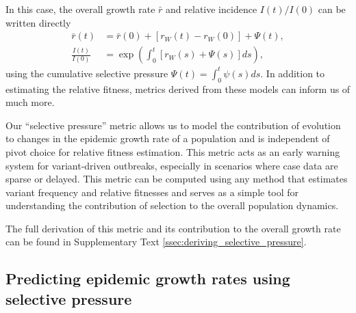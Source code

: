 \documentclass[11pt,oneside,letterpaper]{article}
\newcommand{\wt}{W}
\begin{document}
In this case, the overall growth rate $\bar{r}$ and relative incidence $I(t) / I(0)$ can be written directly
\begin{align}
    \bar{r}(t) &= \bar{r}(0) + [r_{\wt}(t) - r_{\wt}(0)] + \Psi(t),\\
    \frac{I(t)}{I(0)} &= \exp \left( \int_0^t [r_{\wt}(s) + \Psi(s)]ds \right),
\end{align}
using the cumulative selective pressure $\Psi(t) = \int_0^t \psi(s)ds$.
In addition to estimating the relative fitness, metrics derived from these models can inform us of much more.

Our ``selective pressure'' metric allows us to model the contribution of evolution to changes in the epidemic growth rate of a population and is independent of pivot choice for relative fitness estimation.
This metric acts as an early warning system for variant-driven outbreaks, especially in scenarios where case data are sparse or delayed.
This metric can be computed using any method that estimates variant frequency and relative fitnesses and serves as a simple tool for understanding the contribution of selection to the overall population dynamics.

The full derivation of this metric and its contribution to the overall growth rate can be found in Supplementary Text \ref{ssec:deriving_selective_pressure}.

\subsection*{Predicting epidemic growth rates using selective pressure}
\end{document}
